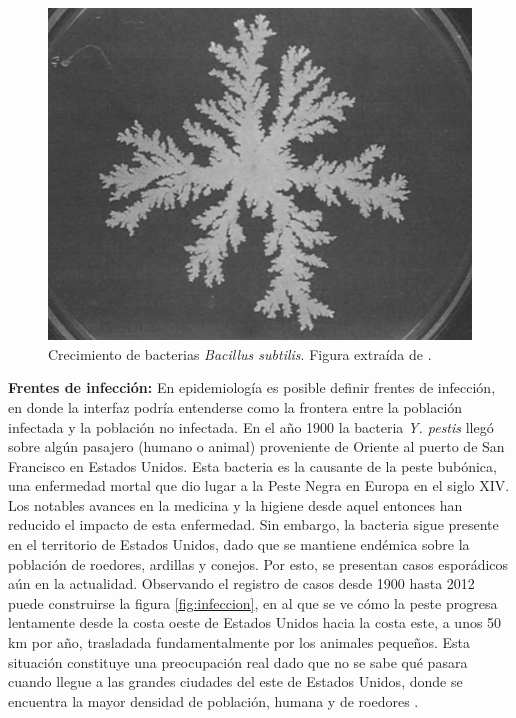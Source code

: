 \begin{figure}[ht]
    \centering
    \includegraphics[width=\imsize]{Bacteria.png}
    \caption[Crecimiento de bacterias \textit{Bacillus subtilis}.]{Crecimiento de bacterias \textit{Bacillus subtilis}. Figura extraída de \cite{matsushita1990diffusion}.}
    \label{fig:bacteria}
\end{figure}

\textbf{Frentes de infección:} En epidemiología es posible definir frentes de infección, en donde la interfaz podría entenderse como la frontera 
entre la población infectada y la población no infectada. En el año 1900 la bacteria \textit{Y. pestis} llegó sobre algún pasajero (humano o animal) proveniente de Oriente
al puerto de San Francisco en Estados Unidos. Esta bacteria es la causante de la peste bubónica, una enfermedad mortal que dio lugar a la Peste Negra en Europa 
en el siglo XIV. Los notables avances en la medicina y la higiene desde aquel entonces han reducido el impacto de esta enfermedad. Sin embargo, la bacteria 
sigue presente en el territorio de Estados Unidos, dado que se mantiene endémica sobre la población de roedores, ardillas y conejos. Por esto, se presentan casos 
esporádicos aún en la actualidad. Observando el registro de casos desde 1900 hasta 2012 puede construirse la figura \ref{fig:infeccion}, en al que se ve cómo la peste 
progresa lentamente desde la costa oeste de Estados Unidos hacia la costa este, a unos 50 km por año, trasladada fundamentalmente por los animales pequeños. Esta 
situación constituye una preocupación real dado que no se sabe qué pasara cuando llegue a las grandes ciudades del este de Estados Unidos, donde se encuentra 
la mayor densidad de población, humana y de roedores \cite{mate_sist_bio,barbieri2020soil,stenseth2008plague}.
\newpage


